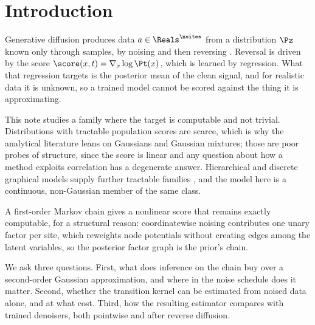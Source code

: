 \documentclass{article}
\begin{document}
\section{Introduction}
\label{sec:intro}

Generative diffusion produces data $a\in\Reals^{\nsites}$ from a distribution $\Pz$ known only
through samples, by noising and then reversing \citep{sohl2015,ho2020,song2021}. Reversal is
driven by the score $\score(x,t)=\nabla_x\log\Pt(x)$, which is learned by regression. What that
regression targets is the posterior mean of the clean signal, and for realistic data it is
unknown, so a trained model cannot be scored against the thing it is approximating.

This note studies a family where the target is computable and not trivial. Distributions with
tractable population scores are scarce, which is why the analytical literature leans on
Gaussians and Gaussian mixtures; those are poor probes of structure, since the score is linear
and any question about how a method exploits correlation has a degenerate answer. Hierarchical
and discrete graphical models supply further tractable families
\citep{sclocchi2025phase,garnierbrun2024transformers,mei2024unet}, and the model here is a
continuous, non-Gaussian member of the same class.

A first-order Markov chain gives a nonlinear score that remains exactly computable, for a
structural reason: coordinatewise noising contributes one unary factor per site, which reweights
node potentials without creating edges among the latent variables, so the posterior factor graph
is the prior's chain.

We ask three questions. First, what does inference on the chain buy over a second-order Gaussian
approximation, and where in the noise schedule does it matter. Second, whether the transition
kernel can be estimated from noised data alone, and at what cost. Third, how the resulting
estimator compares with trained denoisers, both pointwise and after reverse diffusion.
\end{document}
